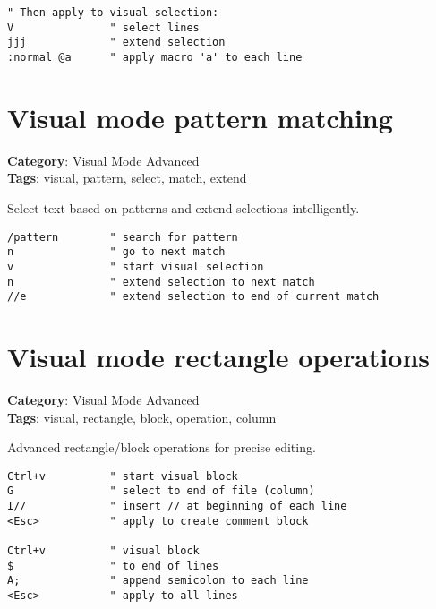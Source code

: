 {{{{{{{{{{{{{{{{{{{\begin{Exa*}{}
\begin{Verbatim}[fontsize=\footnotesize, breaklines, breakanywhere]
" Then apply to visual selection:
V               " select lines
jjj             " extend selection
:normal @a      " apply macro 'a' to each line
\end{Verbatim}
\end{Exa*}

\section{Visual mode pattern matching}

\textbf{Category}: Visual Mode Advanced\\ \textbf{Tags}: visual, pattern, select, match, extend
\vspace{0.5cm}

Select text based on patterns and extend selections intelligently.

\begin{Exa*}{}
\begin{Verbatim}[fontsize=\footnotesize, breaklines, breakanywhere]
/pattern        " search for pattern
n               " go to next match
v               " start visual selection
n               " extend selection to next match
//e             " extend selection to end of current match
\end{Verbatim}
\end{Exa*}

\section{Visual mode rectangle operations}

\textbf{Category}: Visual Mode Advanced\\ \textbf{Tags}: visual, rectangle, block, operation, column
\vspace{0.5cm}

Advanced rectangle/block operations for precise editing.

\begin{Exa*}{}
\begin{Verbatim}[fontsize=\footnotesize, breaklines, breakanywhere]
Ctrl+v          " start visual block
G               " select to end of file (column)
I//             " insert // at beginning of each line
<Esc>           " apply to create comment block

Ctrl+v          " visual block
$               " to end of lines
A;              " append semicolon to each line
<Esc>           " apply to all lines
\end{Verbatim}
\end{Exa*}

}}}}}}}}}}}}}}}}}}}
